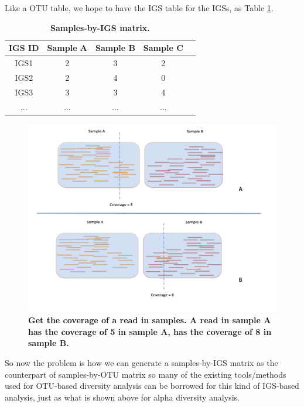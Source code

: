Like a OTU table, we hope to have the IGS table for the IGSs, as Table \ref{table:IGS_table}.

\begin{table}[!ht]
\centering
\begin{tabular}{ |c | c |c| c|c| }
\hline 
    IGS ID & Sample A & Sample B & Sample C \\
\hline 
IGS1 & 2 & 3 & 2  \\
IGS2 & 2 & 4 & 0 \\
IGS3 & 3 & 3 & 4 \\
...  & ... & ... & ... \\
\hline 
\end{tabular}
\caption{\bf Samples-by-IGS matrix.}
\label{table:IGS_table}
\end{table}




\begin{figure}[!ht]
 \centerline{\includegraphics[width=6in]{./figures/read_coverage_samples.png}}
\caption{\bf Get the coverage of a read in samples. A read in sample A has the coverage of 5 in sample A, has
the coverage of 8 in sample B.}
\label{fig:read_coverage_samples}
\end{figure}



    
So now the problem is how we can generate a samples-by-IGS matrix as 
the counterpart of samples-by-OTU matrix so many of the existing 
tools/methods used for OTU-based diversity analysis can be borrowed for this kind 
of IGS-based analysis, just as what is shown above for alpha diversity analysis.

